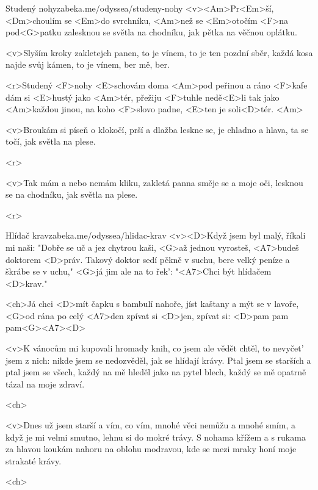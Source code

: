 \begin{song}[Radůza]{37}{Studený nohy}{zabeka.me/odyssea/studeny-nohy}
<v><Am>Pr<Em>ší, <Dm>choulím se <Em>do svrchníku, 
<Am>než se <Em>otočím <F>na pod<G>patku 
zalesknou se světla na chodníku, 
jak pětka na věčnou oplátku. 

<v>Slyším kroky zakletejch panen, 
to je vínem, to je ten pozdní sběr, 
každá kosa najde svůj kámen, 
to je vínem, ber mě, ber. 

<r>Studený <F>nohy <E>schovám doma <Am>pod peřinou 
a ráno <F>kafe dám si <E>hustý jako <Am>tér, 
přežiju <F>tuhle nedě<E>li tak jako <Am>každou jinou, 
na koho <F>slovo padne, <E>ten je soli<D>tér. <Am> 

<v>Broukám si píseň o klokočí, 
prší a dlažba leskne se, 
je chladno a hlava, ta se točí, 
jak světla na plese. 

<r>

<v>Tak mám a nebo nemám kliku, 
zakletá panna směje se 
a moje oči, lesknou se na chodníku, 
jak světla na plese. 

<r>
\end{song}
\begin{song}{38}{Hlídač krav}{zabeka.me/odyssea/hlidac-krav}
<v><D>Když jsem byl malý, říkali mi naši:
"Dobře se uč a jez chytrou kaši,
<G>až jednou vyrosteš, <A7>budeš doktorem <D>práv.
Takový doktor sedí pěkně v suchu,
bere velký peníze a škrábe se v uchu,"
<G>já jim ale na to řek': "<A7>Chci být hlídačem <D>krav."

<ch>Já chci <D>mít čapku s bambulí nahoře,
jíst kaštany a mýt se v lavoře,
<G>od rána po celý <A7>den zpívat si <D>jen,
zpívat si: <D>pam pam pam<G><A7><D>

<v>K vánocům mi kupovali hromady knih,
co jsem ale vědět chtěl, to nevyčet' jsem z nich:
nikde jsem se nedozvěděl, jak se hlídají krávy.
Ptal jsem se starších a ptal jsem se všech,
každý na mě hleděl jako na pytel blech,
každý se mě opatrně tázal na moje zdraví.

<ch>

<v>Dnes už jsem starší a vím, co vím,
mnohé věci nemůžu a mnohé smím,
a když je mi velmi smutno, lehnu si do mokré trávy.
S nohama křížem a s rukama za hlavou
koukám nahoru na oblohu modravou,
kde se mezi mraky honí moje strakaté krávy.

<ch>
\end{song}
